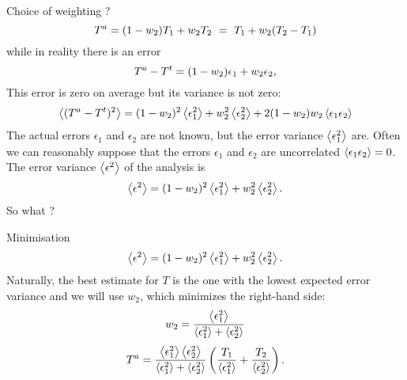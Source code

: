 \begin{frame}{Choice of weighting ?}
\begin{equation}
{T}^a = (1-w_2) T_1 + w_2 T_2  ~=~ T_1 + w_2 (T_2-T_1)
\end{equation}
while in reality there is an error
\begin{equation}
{T}^a - {T}^t = (1-w_2) \epsilon_1 + w_2 \epsilon_2,
\end{equation}
This error is zero on average but its variance is not zero:
\begin{equation}
\left\langle ({T}^a-{T}^t)^2 \right\rangle = (1-w_2)^2 \left\langle \epsilon_1^2 \right\rangle + w_2^2 \left\langle \epsilon_2^2 \right\rangle + 2 (1-w_2) w_2 
\left\langle \epsilon_1 \epsilon_2 \right\rangle
\end{equation}
The actual errors $\epsilon_1$ and $\epsilon_2$ are not known, but the error variance $\left\langle \epsilon_1^2 \right\rangle$ are.
Often we can reasonably suppose that the errors
$\epsilon_1$ and $\epsilon_2$ are uncorrelated $\left\langle \epsilon_1 \epsilon_2 \right\rangle=0$. 
The error variance $\left\langle \epsilon^2 \right\rangle$ of the analysis is
\begin{equation}
\left\langle \epsilon^2 \right\rangle=(1-w_2)^2 \left\langle \epsilon_1^2 \right\rangle + w_2^2 \left\langle \epsilon_2^2 \right\rangle.
\label{eq:epsilonerror}
\end{equation}
So what ?
\end{frame}


\begin{frame}{Minimisation}
\begin{equation}
\left\langle \epsilon^2 \right\rangle=(1-w_2)^2 \left\langle \epsilon_1^2 \right\rangle + w_2^2 \left\langle \epsilon_2^2 \right\rangle.
\label{eq:epsilonerror}
\end{equation}
Naturally, the best estimate for $T$ is the one with the lowest expected error variance and we will use $w_2$, which minimizes
the right-hand side:
\begin{equation}
w_2 = \frac{\left\langle \epsilon_1^2 \right\rangle}{\left\langle \epsilon_1^2 \right\rangle+\left\langle \epsilon_2^2 \right\rangle}
\label{eq:weighterror}
\end{equation}
\begin{equation}
{T}^a=   {\left\langle \epsilon_1^2 \right\rangle \left\langle \epsilon_2^2 \right\rangle \over \left\langle \epsilon_1^2 \right\rangle 
+ \left\langle \epsilon_2^2 \right\rangle }\left( {T_1 \over \left\langle \epsilon_1^2 \right\rangle} + {T_2 \over \left\langle \epsilon_2^2 \right\rangle}\right) .
 \label{eq:analyzedTb}
\end{equation}
\end{frame}

